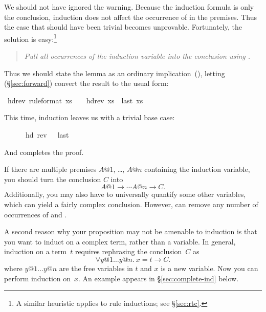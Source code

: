 \begin{isabellebody}
\begin{isamarkuptxt}
We should not have ignored the warning. Because the induction
formula is only the conclusion, induction does not affect the occurrence of  in the premises.  
Thus the case that should have been trivial
becomes unprovable. Fortunately, the solution is easy:\footnote{A similar
heuristic applies to rule inductions; see \S\ref{sec:rtc}.}
\begin{quote}
\emph{Pull all occurrences of the induction variable into the conclusion
using \isa{{\isasymlongrightarrow}}.}
\end{quote}
Thus we should state the lemma as an ordinary 
implication~(\isa{{\isasymlongrightarrow}}), letting
 (\S\ref{sec:forward}) convert the
result to the usual \isa{{\isasymLongrightarrow}} form:%
\end{isamarkuptxt}%
\isamarkuptrue%
\isamarkupfalse%
\ hd{\isacharunderscore}rev\ {\isacharbrackleft}rule{\isacharunderscore}format{\isacharbrackright}{\isacharcolon}\ {\isachardoublequote}xs\ {\isasymnoteq}\ {\isacharbrackleft}{\isacharbrackright}\ {\isasymlongrightarrow}\ hd{\isacharparenleft}rev\ xs{\isacharparenright}\ {\isacharequal}\ last\ xs{\isachardoublequote}\isamarkupfalse%
\isamarkupfalse%
%
\begin{isamarkuptxt}%
\noindent
This time, induction leaves us with a trivial base case:
\begin{isabelle}%
\ {}{\isachardot}\ {\isacharbrackleft}{\isacharbrackright}\ {\isasymnoteq}\ {\isacharbrackleft}{\isacharbrackright}\ {\isasymlongrightarrow}\ hd\ {\isacharparenleft}rev\ {\isacharbrackleft}{\isacharbrackright}{\isacharparenright}\ {\isacharequal}\ last\ {\isacharbrackleft}{\isacharbrackright}%
\end{isabelle}
And  completes the proof.

If there are multiple premises $A@1$, \dots, $A@n$ containing the
induction variable, you should turn the conclusion $C$ into
\[ A@1 \longrightarrow \cdots A@n \longrightarrow C. \]
Additionally, you may also have to universally quantify some other variables,
which can yield a fairly complex conclusion.  However,  
can remove any number of occurrences of \isa{{\isasymforall}} and
\isa{{\isasymlongrightarrow}}.

%
A second reason why your proposition may not be amenable to induction is that
you want to induct on a complex term, rather than a variable. In
general, induction on a term~$t$ requires rephrasing the conclusion~$C$
as
\begin{equation}\label{eqn:ind-over-term}
\forall y@1 \dots y@n.~ x = t \longrightarrow C.
\end{equation}
where $y@1 \dots y@n$ are the free variables in $t$ and $x$ is a new variable.
Now you can perform induction on~$x$. An example appears in
\S\ref{sec:complete-ind} below.


\end{isamarkuptxt}
\end{isabellebody}
